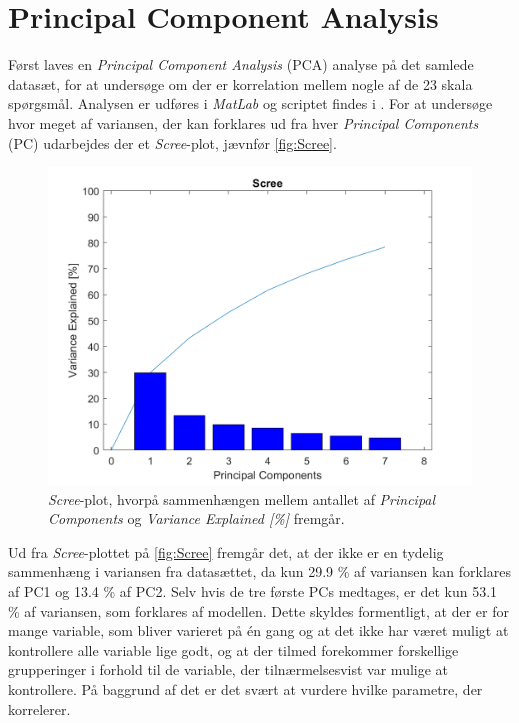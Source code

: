 \section{Principal Component Analysis}
\label{DatabehandlingPCA}
%
Først laves en \textit{Principal Component Analysis} (PCA) analyse på det samlede datasæt, for at undersøge om der er korrelation mellem nogle af de 23 skala spørgsmål. Analysen er udføres i \textit{MatLab} og scriptet findes i . For at undersøge hvor meget af variansen, der kan forklares ud fra hver \textit{Principal Components} (PC) udarbejdes der et \textit{Scree}-plot, jævnfør \autoref{fig:Scree}. 
%
\begin{figure}[H]
\centering
\includegraphics[width=\textwidth]{Figure/DatabehandlingSkalaer/PCAfigures/Scree.png}
\caption{\textit{Scree}-plot, hvorpå sammenhængen mellem antallet af \textit{Principal Components} og \textit{Variance Explained [\%]} fremgår.}
\label{fig:Scree}
\end{figure}
\noindent
%
Ud fra \textit{Scree}-plottet på \autoref{fig:Scree} fremgår det, at der ikke er en tydelig sammenhæng i variansen fra datasættet, da kun 29.9 \% af variansen kan forklares af PC1 og 13.4 \% af PC2. Selv hvis de tre første PCs medtages, er det kun 53.1 \% af variansen, som forklares af modellen. Dette skyldes formentligt, at der er for mange variable, som bliver varieret på én gang og at det ikke har været muligt at kontrollere alle variable lige godt, og at der tilmed forekommer forskellige grupperinger i forhold til de variable, der tilnærmelsesvist var mulige at kontrollere. På baggrund af det er det svært at vurdere hvilke parametre, der korrelerer.\blankline 
